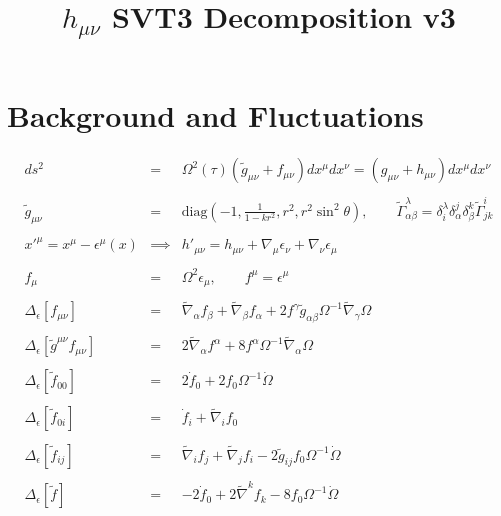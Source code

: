 \documentclass[10pt,letterpaper]{article}
\title{$h_{\mu\nu}$ SVT3 Decomposition v3}
\date{}
\numberwithin{equation}{section}
\begin{document}
 
\maketitle
\noindent 

\section{Background and Fluctuations}
\begin{eqnarray}
ds^2 &=& \Omega^2(\tau)(\tilde g_{\mu\nu} + f_{\mu\nu})dx^\mu dx^\nu = (g_{\mu\nu} +h_{\mu\nu}) dx^\mu dx^\nu
\\ \nonumber\\
\tilde g_{\mu\nu} &=& \text{diag}\left(-1,\frac{1}{1-kr^2}, r^2, r^2\sin^2\theta\right),\qquad \tilde \Gamma^{\lambda}_{\alpha\beta} = \delta^\lambda_i \delta^j_\alpha \delta^k_\beta \tilde \Gamma^{i}_{jk}
\\ \nonumber\\
x'^\mu = x^\mu - \epsilon^\mu(x) &\implies&  h'_{\mu\nu} = h_{\mu\nu} + \nabla_\mu \epsilon_\nu + \nabla_\nu \epsilon_\mu
\label{gaugetrans}
\\ \nonumber\\
f_{\mu} &=& \Omega^2 \epsilon_\mu,\qquad f^\mu = \epsilon^\mu
\\ \nonumber\\
\Delta_\epsilon\left[ f_{\mu\nu} \right]  &=& \tilde\nabla_{\alpha }f_{\beta } + \tilde\nabla_{\beta }f_{\alpha } + 2 f^{\gamma } \tilde g_{\alpha \beta } \Omega^{-1} \tilde\nabla_{\gamma }\Omega 
\\ \nonumber\\
\Delta_\epsilon\left[ \tilde g^{\mu\nu} f_{\mu\nu} \right] &=&   
2 \tilde{\nabla}_{\alpha }f^{\alpha } + 8 f^{\alpha } \Omega^{-1} \tilde{\nabla}_{\alpha }\Omega 
\\ \nonumber\\
\Delta_\epsilon\left[ \tilde f_{00} \right] &=&  2\dot f_0 + 2f_0 \Omega^{-1}\dot \Omega
\\ \nonumber\\
\Delta_\epsilon\left[ \tilde f_{0i} \right]  &=&  \dot f_i + \tilde\nabla_i f_0
\\ \nonumber\\
\Delta_\epsilon\left[ \tilde f_{ij}  \right]  &=& \tilde\nabla_{i }f_{j } + \tilde\nabla_{j}f_{i} - 2\tilde g_{ij} f_0 \Omega^{-1}\dot \Omega
\\ \nonumber\\
\Delta_\epsilon\left[ \tilde f \right]  &=&  -2\dot f_0 + 2\tilde\nabla^k f_k -8 f_0 \Omega^{-1}\dot \Omega
\end{eqnarray}
\end{document}
